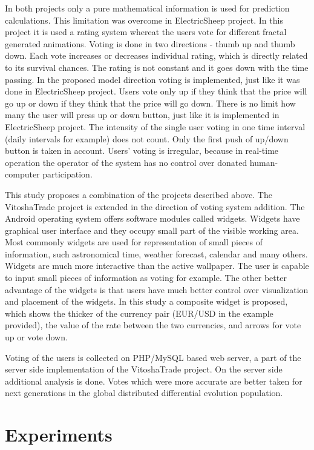 \documentclass[runningheads]{llncs}
\begin{document}
In both projects only a pure mathematical information is used for prediction calculations. This limitation was overcome in ElectricSheep\cite{draves01} project. In this project it is used a rating system whereat the users vote for different fractal generated animations. Voting is done in two directions - thumb up and thumb down. Each vote increases or decreases individual rating, which is directly related to its survival chances. The rating is not constant and it goes down with the time passing. In the proposed model direction voting is implemented, just like it was done in ElectricSheep project. Users vote only up if they think that the price will go up or down if they think that the price will go down. There is no limit how many the user will press up or down button, just like it is implemented in ElectricSheep project. The intensity of the single user voting in one time interval (daily intervals for example) does not count. Only the first push of up/down button is taken in account. Users' voting is irregular, because in real-time operation the operator of the system has no control over donated human-computer participation. 

This study proposes a combination of the projects described above. The VitoshaTrade\cite{balabanov01} project is extended in the direction of voting system addition. The Android operating system offers software modules called widgets. Widgets have graphical user interface and they occupy small part of the visible working area. Most commonly widgets are used for representation of small pieces of information, such astronomical time, weather forecast, calendar and many others. Widgets are much more interactive than the active wallpaper. The user is capable to input small pieces of information as voting for example. The other better advantage of the widgets is that users have much better control over visualization and placement of the widgets. In this study a composite widget is proposed, which shows the thicker of the currency pair (EUR/USD in the example provided), the value of the rate between the two currencies, and arrows for vote up or vote down. 

Voting of the users is collected on PHP/MySQL based web server\cite{tomov01}, a part of the server side implementation of the VitoshaTrade project. On the server side additional analysis is done. Votes which were more accurate are better taken for next generations in the global distributed differential evolution population. 

\section{Experiments} \label{Experiments}
\end{document}
